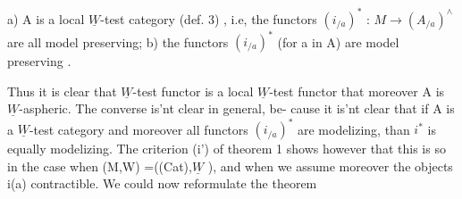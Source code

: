 a) A is a local $\underline{W}$-test category (def. 3) , i.e, the functors
$(i_{/a})^*$ : $M \to (A_{/a})^\wedge$ are all model preserving;
b) the functors $(i_{/a})^*$ (for a in A) are model preserving .

Thus it is clear that   $\underline{W}$-test functor  is a local $\underline{W}$-test functor  
that moreover A is $\underline{W}$-aspheric. The converse is'nt clear in general, be-%
cause it is'nt clear that if A is a $\underline{W}$-test category and moreover all
functors $(i_{/a})^*$ are modelizing, than $i^*$ is equally modelizing. The
criterion (i') of theorem 1 shows however that this is so in the case
when (M,W) =((Cat),$\underline{W}$ ), and when we assume moreover the objects i(a)
contractible.  We could now reformulate the theorem
